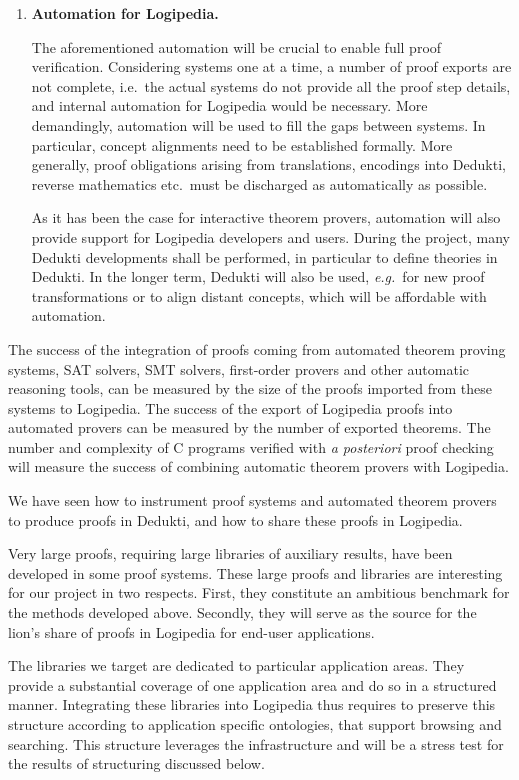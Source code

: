 \begin{enumerate}[\bf(a)]
\item{\bf Automation for Logipedia.}

  The aforementioned automation will be crucial to enable full proof
verification. Considering systems one at a time, a number of proof
exports are not complete, i.e.\ the actual systems do not provide
all the proof step details, and internal automation for Logipedia would be
necessary. More demandingly, automation will be used to fill the gaps
between systems. In particular, concept alignments need to be established
formally. More generally, proof obligations arising from translations,
encodings into Dedukti, reverse mathematics etc.\ must be discharged
as automatically as possible.

As it has been the case for interactive theorem provers, automation
will also provide support for Logipedia developers and users. During
the project, many Dedukti developments shall be performed, in
particular to define theories in Dedukti. In the longer term, Dedukti
will also be used, \emph{e.g.}\ for new proof transformations or to
align distant concepts, which will be affordable with automation.
\end{enumerate}

The success of the integration of proofs coming from automated theorem
proving systems, SAT solvers, SMT solvers, first-order provers and other
automatic reasoning tools, can be
measured by the size of the proofs imported from these systems to Logipedia.
%
The success of the export of Logipedia proofs into automated provers can
be measured by the number of exported theorems.
%
The number and complexity of C programs verified with {\em a posteriori}
proof checking will measure the success of combining automatic theorem provers with Logipedia.


We have seen how to instrument proof systems and
automated theorem provers to produce proofs in Dedukti, and how to
share these proofs in Logipedia.

Very large proofs, requiring large libraries of auxiliary results,
have been developed in some proof systems. These large proofs and
libraries are interesting for our project in two respects. First, they
constitute an ambitious benchmark for the methods developed
above. Secondly, they will serve as the source for the lion's share of
proofs in Logipedia for end-user applications.

The libraries we target are dedicated to particular application
areas. They provide a substantial coverage of one application area and
do so in a structured manner. Integrating these libraries into
Logipedia thus requires to preserve this structure according to
application specific ontologies, that support browsing and
searching. This structure leverages the infrastructure and will be a
stress test for the results of structuring discussed below.

